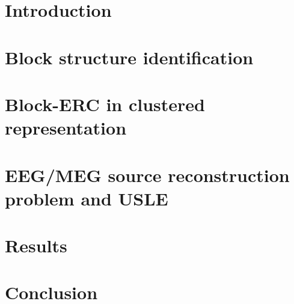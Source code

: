 

\section{Introduction}


\section{Block structure identification}
\label{sec:Block structure identification} 

\section{Block-ERC in clustered representation}
\label{sec:Sparsity level for clustered blocks of a dictionary} 

\newpage
\section{EEG/MEG source reconstruction problem and USLE}
\label{sec:EEG/MEG source reconstruction problem and USLE}

\section{Results}
\label{sec:hierarchical_cluster_estim} 

\section{Conclusion}
